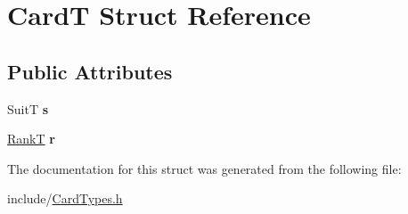 \hypertarget{struct_card_t}{}\section{CardT Struct Reference}
\label{struct_card_t}
\subsection*{Public Attributes}
\begin{DoxyCompactItemize}
\item 
\mbox{\label{struct_card_t_a385c4f8ec261203df28f85f69f28780d}} 
SuitT {\bfseries s}
\item 
\mbox{\label{struct_card_t_a306faf354f2fb4bb43439f84bbc49f05}} 
\hyperlink{_card_types_8h_aa7b61ab74252d345d621b846db6238f1}{RankT} {\bfseries r}
\end{DoxyCompactItemize}


The documentation for this struct was generated from the following file\+:\begin{DoxyCompactItemize}
\item 
include/\hyperlink{_card_types_8h}{Card\+Types.\+h}\end{DoxyCompactItemize}
